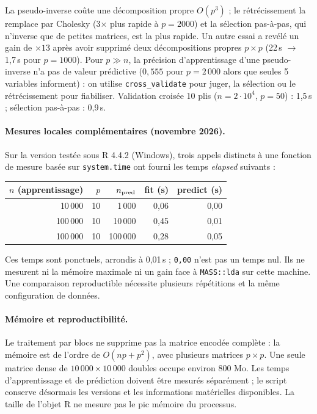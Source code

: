 \documentclass[10.5pt,a4paper]{article}
\newcommand{\code}[1]{\texttt{#1}}
\begin{document}
La pseudo-inverse co\^ute une d\'ecomposition propre $O(p^3)$ ; le r\'etr\'ecissement la remplace par Cholesky (3$\times$ plus rapide \`a $p=2000$) et la s\'election pas-\`a-pas, qui n'inverse que de petites matrices, est la plus rapide. Un autre essai a rev\'el\'e un gain de $\times 13$ apr\`es avoir supprim\'e deux d\'ecompositions propres $p\times p$ (22\,s $\to$ 1,7\,s pour $p=1000$). Pour $p\gg n$, la pr\'ecision d'apprentissage d'une pseudo-inverse n'a pas de valeur pr\'edictive ($0{,}555$ pour $p=2\,000$ alors que seules 5 variables informent) : on utilise \code{cross\_validate} pour juger, la s\'election ou le r\'etr\'ecissement pour fiabiliser. Validation crois\'ee 10 plis ($n=2\cdot10^4$, $p=50$) : 1,5\,s ; s\'election pas-\`a-pas : 0,9\,s.


\paragraph{Mesures locales compl\'ementaires (novembre 2026).}
Sur la version test\'ee sous R 4.4.2 (Windows), trois appels distincts \`a une fonction de mesure bas\'ee sur \code{system.time} ont fourni les temps \emph{elapsed} suivants :
\begin{center}
\begin{tabular}{|r|r|r|r|r|}\hline
$n$ (apprentissage) & $p$ & $n_{\rm pred}$ & fit (s) & predict (s)\\\hline
10\,000 & 10 & 1\,000 & 0,06 & 0,00\\
100\,000 & 10 & 10\,000 & 0,45 & 0,01\\
100\,000 & 10 & 100\,000 & 0,28 & 0,05\\\hline
\end{tabular}
\end{center}
Ces temps sont ponctuels, arrondis \`a 0,01\,s ; \code{0,00} n'est pas un temps nul. Ils ne mesurent ni la m\'emoire maximale ni un gain face \`a \code{MASS::lda} sur cette machine. Une comparaison reproductible n\'ecessite plusieurs r\'ep\'etitions et la m\^eme configuration de donn\'ees.

\paragraph{M\'emoire et reproductibilit\'e.} Le traitement par blocs ne supprime pas la matrice encod\'ee compl\`ete : la m\'emoire est de l'ordre de $O(np+p^2)$, avec plusieurs matrices $p\times p$. Une seule matrice dense de $10\,000\times10\,000$ doubles occupe environ 800 Mo. Les temps d'apprentissage et de pr\'ediction doivent \^etre mesur\'es s\'epar\'ement ; le script conserve d\'esormais les versions et les informations mat\'erielles disponibles. La taille de l'objet R ne mesure pas le pic m\'emoire du processus.
\end{document}
